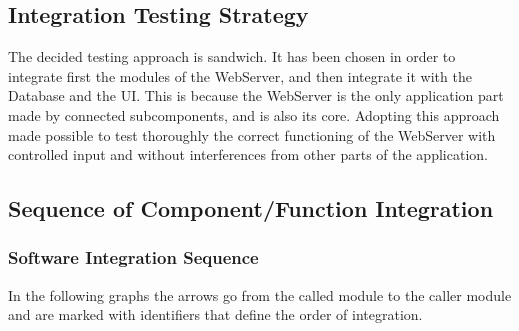 \documentclass{article}
\begin{document}
\subsection{Integration Testing Strategy}
The decided testing approach is sandwich. It has been chosen in order to 
integrate first the modules of the WebServer, and then integrate it
 with the Database and the UI. This is because the WebServer
is the only application part made by connected subcomponents, and
is also its core. Adopting this approach made possible to 
test thoroughly the correct functioning of the WebServer with controlled input and
 without interferences from other parts of the application.

\subsection{Sequence of Component/Function Integration}
\subsubsection{Software Integration Sequence}
In the following graphs the arrows go 
from the called module to the caller module
and are marked with identifiers that define
the order of integration.
\end{document}

